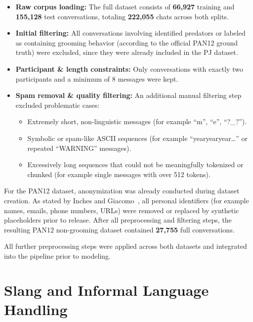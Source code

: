 \begin{itemize}
    \item \textbf{Raw corpus loading:} The full dataset consists of \textbf{66,927} training and \textbf{155,128} test conversations, totaling \textbf{222,055} chats across both splits.
    \item \textbf{Initial filtering:} All conversations involving identified predators or labeled as containing grooming behavior (according to the official PAN12 ground truth) were excluded, since they were already included in the PJ dataset.
    \item \textbf{Participant \& length constraints:} Only conversations with exactly two participants and a minimum of 8 messages were kept.
    \item \textbf{Spam removal \& quality filtering:} An additional manual filtering step excluded problematic cases:
    \begin{itemize}
        \item Extremely short, non-linguistic messages (for example \enquote{m}, \enquote{e}, \enquote{?\_?}).
        \item Symbolic or spam-like ASCII sequences (for example \enquote{yearyearyear\ldots} or repeated \enquote{WARNING} messages).
        \item Excessively long sequences that could not be meaningfully tokenized or chunked (for example single messages with over 512 tokens).
    \end{itemize}
\end{itemize}

For the PAN12 dataset, anonymization was already conducted during dataset creation. As stated by Inches and Giacomo~\cite{inches2012pan}, all personal identifiers (for example names, emails, phone numbers, URLs) were removed or replaced by synthetic placeholders prior to release. After all preprocessing and filtering steps, the resulting PAN12 non-grooming dataset contained \textbf{27,755} full conversations.

All further preprocessing steps were applied across both datasets and integrated into the pipeline prior to modeling.

\section{Slang and Informal Language Handling}

